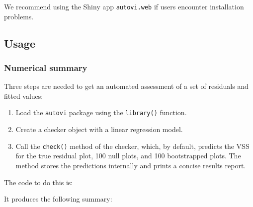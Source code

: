\documentclass[
doublespace,
  times]{anzsauth}
\newenvironment{Shaded}{\begin{snugshade}}{\end{snugshade}}
\newcommand{\AttributeTok}[1]{\textcolor[rgb]{0.40,0.45,0.13}{#1}}
\newcommand{\FunctionTok}[1]{\textcolor[rgb]{0.28,0.35,0.67}{#1}}
\newcommand{\NormalTok}[1]{\textcolor[rgb]{0.00,0.23,0.31}{#1}}
\newcommand{\OtherTok}[1]{\textcolor[rgb]{0.00,0.23,0.31}{#1}}
\newcommand{\SpecialCharTok}[1]{\textcolor[rgb]{0.37,0.37,0.37}{#1}}
\providecommand{\tightlist}{%
  \setlength{\itemsep}{0pt}\setlength{\parskip}{0pt}}\usepackage{longtable,booktabs,array}
\begin{document}
We recommend using the Shiny app \texttt{autovi.web} if users encounter
installation problems.

\subsection{Usage}\label{sec-autovi-usage}

\subsubsection{Numerical summary}\label{sec-autovi-numerical}

Three steps are needed to get an automated assessment of a set of
residuals and fitted values:

\begin{enumerate}
\def\labelenumi{\arabic{enumi}.}
\tightlist
\item
  Load the \texttt{autovi} package using the \texttt{library()}
  function.
\item
  Create a checker object with a linear regression model.
\item
  Call the \texttt{check()} method of the checker, which, by default,
  predicts the VSS for the true residual plot, 100 null plots, and 100
  bootstrapped plots. The method stores the predictions internally and
  prints a concise results report.
\end{enumerate}

The code to do this is:

\begin{Shaded}
\end{Shaded}

It produces the following summary:

\begin{verbatim}
\end{verbatim}
\end{document}
